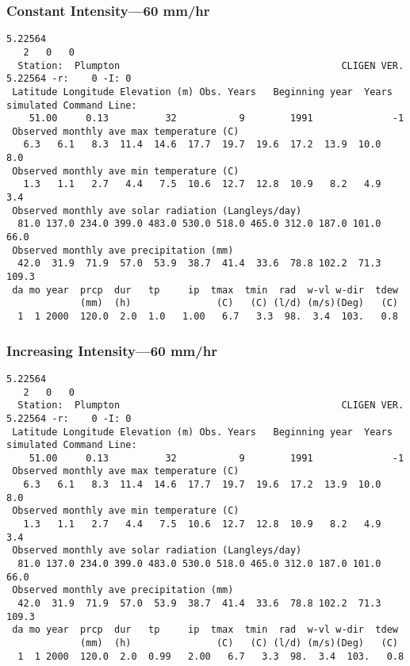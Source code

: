 \subsubsection{Constant Intensity---60 mm/hr}
\label{sec:ConstantIntensity60MmHr}

\begin{verbatim}
5.22564
   2   0   0
  Station:  Plumpton                                       CLIGEN VER. 5.22564 -r:    0 -I: 0
 Latitude Longitude Elevation (m) Obs. Years   Beginning year  Years simulated Command Line:
    51.00     0.13          32           9        1991              -1          
 Observed monthly ave max temperature (C)
   6.3   6.1   8.3  11.4  14.6  17.7  19.7  19.6  17.2  13.9  10.0   8.0
 Observed monthly ave min temperature (C)
   1.3   1.1   2.7   4.4   7.5  10.6  12.7  12.8  10.9   8.2   4.9   3.4
 Observed monthly ave solar radiation (Langleys/day)
  81.0 137.0 234.0 399.0 483.0 530.0 518.0 465.0 312.0 187.0 101.0  66.0
 Observed monthly ave precipitation (mm)
  42.0  31.9  71.9  57.0  53.9  38.7  41.4  33.6  78.8 102.2  71.3 109.3
 da mo year  prcp  dur   tp     ip  tmax  tmin  rad  w-vl w-dir  tdew
             (mm)  (h)               (C)   (C) (l/d) (m/s)(Deg)   (C)
  1  1 2000  120.0  2.0  1.0   1.00   6.7   3.3  98.  3.4  103.   0.8
\end{verbatim}

\subsubsection{Increasing Intensity---60 mm/hr}
\label{sec:IncreasingIntensity60MmHr}

\begin{verbatim}
5.22564
   2   0   0
  Station:  Plumpton                                       CLIGEN VER. 5.22564 -r:    0 -I: 0
 Latitude Longitude Elevation (m) Obs. Years   Beginning year  Years simulated Command Line:
    51.00     0.13          32           9        1991              -1          
 Observed monthly ave max temperature (C)
   6.3   6.1   8.3  11.4  14.6  17.7  19.7  19.6  17.2  13.9  10.0   8.0
 Observed monthly ave min temperature (C)
   1.3   1.1   2.7   4.4   7.5  10.6  12.7  12.8  10.9   8.2   4.9   3.4
 Observed monthly ave solar radiation (Langleys/day)
  81.0 137.0 234.0 399.0 483.0 530.0 518.0 465.0 312.0 187.0 101.0  66.0
 Observed monthly ave precipitation (mm)
  42.0  31.9  71.9  57.0  53.9  38.7  41.4  33.6  78.8 102.2  71.3 109.3
 da mo year  prcp  dur   tp     ip  tmax  tmin  rad  w-vl w-dir  tdew
             (mm)  (h)               (C)   (C) (l/d) (m/s)(Deg)   (C)
  1  1 2000  120.0  2.0  0.99   2.00   6.7   3.3  98.  3.4  103.   0.8
\end{verbatim}

